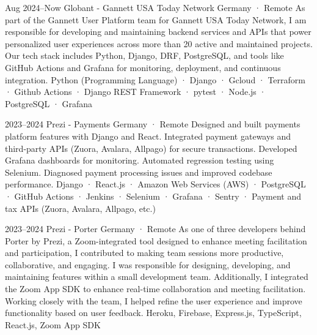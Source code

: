 \documentclass[a4paper,nocolors]{cv-friggeri-x}
\begin{document}
\begin{entrylist}


\entryexperience
{Aug 2024--Now}
{Globant - Gannett USA Today Network }
{Germany · Remote}
{As part of the Gannett User Platform team for Gannett USA Today Network, I am responsible for developing and maintaining backend services and APIs that power personalized user experiences across more than 20 active and maintained projects. Our tech stack includes Python, Django, DRF, PostgreSQL, and tools like GitHub Actions and Grafana for monitoring, deployment, and continuous integration.}
{Python (Programming Language) · Django · Gcloud · Terraform · Github Actions · Django REST Framework · pytest · Node.js · PostgreSQL · Grafana}


\entryexperience
{2023--2024}
{Prezi - Payments }
{Germany · Remote}
{Designed and built payments platform features with Django and React. Integrated payment gateways and third-party APIs (Zuora, Avalara, Allpago) for secure transactions. Developed Grafana dashboards for monitoring. Automated regression testing using Selenium. Diagnosed payment processing issues and improved codebase performance.}
{Django · React.js · Amazon Web Services (AWS) · PostgreSQL · GitHub Actions · Jenkins · Selenium · Grafana · Sentry · Payment and tax APIs (Zuora, Avalara, Allpago, etc.)}

\entryexperience
{2023--2024}
{Prezi - Porter}
{Germany · Remote}
{As one of three developers behind Porter by Prezi, a Zoom-integrated tool designed to enhance meeting facilitation and participation, I contributed to making team sessions more productive, collaborative, and engaging. I was responsible for designing, developing, and maintaining features within a small development team. Additionally, I integrated the Zoom App SDK to enhance real-time collaboration and meeting facilitation. Working closely with the team, I helped refine the user experience and improve functionality based on user feedback.}
{Heroku, Firebase, Express.js, TypeScript, React.js, Zoom App SDK}


\end{entrylist}
\end{document}
